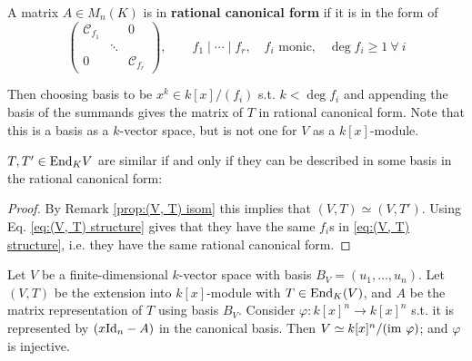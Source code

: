 \documentclass{article}
\begin{document}
\begin{definition}
    A matrix $A\in M_n(K)$ is in \textbf{rational canonical form} if it is in the form of
    \[
        \begin{pmatrix}
            \mathcal{C}_{f_1} & & 0 \\
            & \ddots & \\
            0 & & \mathcal{C}_{f_r}
        \end{pmatrix}, \qquad f_1\mid \cdots \mid f_r,\quad f_i \text{ monic,}\quad \deg f_i \geq 1\ \forall\ i
    \]
\end{definition}

Then choosing basis to be $x^k \in k[x]/(f_i)$ s.t. $k < \deg f_i$ and appending the basis of the summands gives the matrix of $T$ in rational canonical form. Note that this is a basis as a $k$-vector space, but is not one for $V$ as a $k[x]$-module. 

\begin{remark}
    $T, T'\in\mathrm{End}_K{V}$ are similar if and only if they can be described in some basis in the rational canonical form:
\end{remark}

\begin{proof}
    By Remark \ref{prop:(V, T) isom} this implies that $(V, T) \simeq (V, T')$. Using Eq. \ref{eq:(V, T) structure} gives that they have the same $f_i$s in \ref{eq:(V, T) structure}, i.e. they have the same rational canonical form.
\end{proof}

\begin{proposition}
    Let $V$ be a finite-dimensional $k$-vector space with basis $B_V = (u_1, \ldots , u_n)$. Let $(V, T)$ be the extension into $k[x]$-module with $T\in\mathrm{End}_K(V)$, and $A$ be the matrix representation of $T$ using basis $B_V$. Consider $\varphi: k[x]^n \to k[x]^n$ s.t. it is represented by $(x\mathrm{Id}_n - A)$ in the canonical basis. Then $V \simeq k[x]^n/(\mathrm{im}\  \varphi)$; and $\varphi$ is injective. 
\end{proposition}
\end{document}
